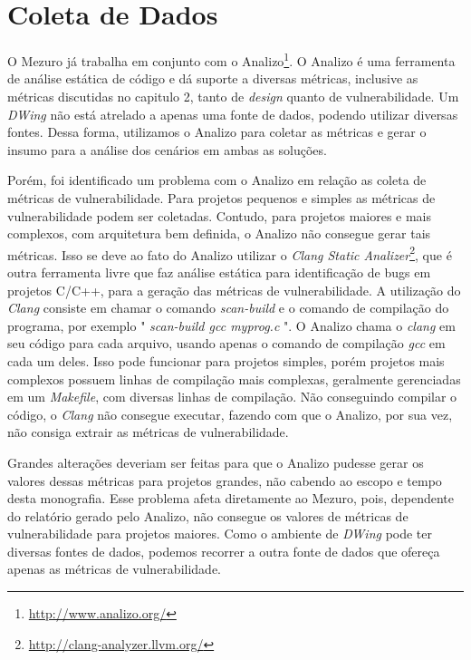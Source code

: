 \section{Coleta de Dados}
\label{data-colect}

O Mezuro já trabalha em conjunto com o Analizo\footnote{\url{http://www.analizo.org/}}. O Analizo é uma ferramenta de análise estática de código e dá suporte a diversas métricas, inclusive as métricas discutidas no capitulo 2, tanto de \emph{design} quanto de vulnerabilidade. Um \emph{DWing} não está atrelado a apenas uma fonte de dados, podendo utilizar diversas fontes. Dessa forma, utilizamos o Analizo para coletar as métricas e gerar o insumo para a análise dos cenários em ambas as soluções.

Porém, foi identificado um problema com o Analizo em relação as coleta de métricas de vulnerabilidade. Para projetos pequenos e simples as métricas de vulnerabilidade podem ser coletadas.  Contudo, para projetos maiores e mais complexos, com arquitetura bem definida, o Analizo não consegue gerar tais métricas. Isso se deve ao fato do Analizo utilizar o \emph{Clang Static Analizer}\footnote{\url{http://clang-analyzer.llvm.org/}}, que é outra ferramenta livre que faz análise estática para identificação de bugs em projetos C/C++, para a geração das métricas de vulnerabilidade. A utilização do \emph{Clang} consiste em chamar o comando \emph{scan-build}  e o comando de compilação do programa, por exemplo " \emph{scan-build gcc myprog.c} ". O Analizo chama o \emph{clang} em seu código para cada arquivo, usando apenas o comando  de compilação \emph{gcc} em cada um deles. Isso pode funcionar para projetos simples, porém projetos mais complexos possuem linhas de compilação mais complexas, geralmente gerenciadas em um \emph{Makefile}, com diversas linhas de compilação. Não conseguindo compilar o código, o \emph{Clang} não consegue executar, fazendo com que o Analizo, por sua vez, não consiga extrair as métricas de vulnerabilidade. 

Grandes alterações deveriam ser feitas para que o Analizo pudesse gerar os valores dessas métricas para projetos grandes, não cabendo ao escopo e tempo desta monografia. Esse problema afeta diretamente ao Mezuro, pois, dependente do relatório gerado pelo Analizo, não consegue os valores de métricas de vulnerabilidade para projetos maiores. Como o ambiente de \emph{DWing} pode ter diversas fontes de dados, podemos recorrer a outra fonte de dados que ofereça apenas as métricas de vulnerabilidade.

